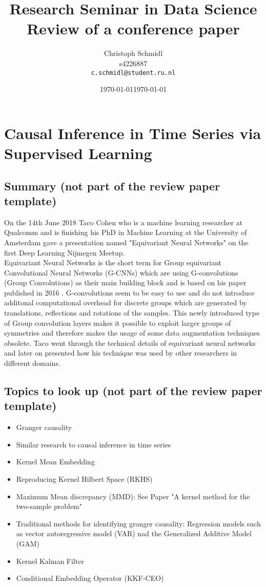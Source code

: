 \documentclass[a4paper]{article}
\title{Research Seminar in Data Science\\Review of a conference paper}
\author{
  Christoph Schmidl\\ s4226887\\      \texttt{c.schmidl@student.ru.nl}
}
\date{\today}
\date{\today}
\begin{document}
\maketitle





\section{Causal Inference in Time Series via Supervised Learning}

\subsection{Summary (not part of the review paper template)}

On the 14th June 2018 Taco Cohen who is a machine learning researcher at Qualcomm and is finishing his PhD in Machine Learning at the University of Amsterdam gave a presentation named "Equivariant Neural Networks" on the first Deep Learning Nijmegen Meetup.\\ 
Equivariant Neural Networks is the short term for Group equivariant Convolutional Neural Networks (G-CNNs) which are using G-convolutions (Group Convolutions) as their main building block and is based on his paper published in 2016 \cite{cohen2016group}. G-convolutions seem to be easy to use and do not introduce additonal computational overhead for discrete groups which are generated by translations, reflections and rotations of the samples. This newly introduced type of Group convolution layers makes it possible to exploit larger groups of symmetries and therefore makes the usage of some data augmentation techniques obsolete. Taco went through the technical details of equivariant neural networks and later on presented how his technique was used by other researchers in different domains.\\


\subsection{Topics to look up (not part of the review paper template)}

\begin{itemize}
	\item Granger causality
	\item Similar research to causal inference in time series
	\item Kernel Mean Embedding
	\item Reproducing Kernel Hilbert Space (RKHS)
	\item Maximum Mean discrepancy (MMD): See Paper "A kernel method for the two-sample problem"
	\item Traditional methods for identifying granger causality: Regression models such as vector autoregressive model (VAR) nad the Generalized Additive Model (GAM)
	\item Kernel Kalman Filter
	\item Conditional Embedding Operator (KKF-CEO)
\end{itemize}
\end{document}
